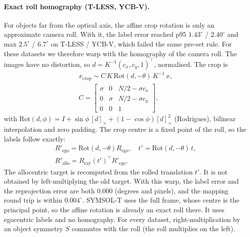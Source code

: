 \paragraph{Exact roll homography (T-LESS, YCB-V).}
For objects far from the optical axis, the affine crop rotation is only an approximate camera roll. With it, the label error reached p95 $1.43^\circ$ / $2.40^\circ$ and max $2.5^\circ$ / $6.7^\circ$ on T-LESS / YCB-V, which failed the same pre-set rule. For these datasets we therefore warp with the homography of the camera roll. The images have no distortion, so $d=K^{-1}(c_x,c_y,1)^\top$, normalised. The crop is
\begin{equation}
\begin{gathered}
  x_{\text{crop}}\sim C\,K\,\mathrm{Rot}(d,-\theta)\,K^{-1}\,x,\\
  C=\begin{bmatrix}\sigma&0&N/2-\sigma c_x\\0&\sigma&N/2-\sigma c_y\\0&0&1\end{bmatrix},
\end{gathered}
\end{equation}
with $\mathrm{Rot}(d,\phi)=I+\sin\phi\,[d]_\times+(1-\cos\phi)[d]_\times^2$ (Rodrigues), bilinear interpolation and zero padding. The crop centre is a fixed point of the roll, so the labels follow exactly:
\begin{equation}
\begin{gathered}
  R'_{\text{ego}}=\mathrm{Rot}(d,-\theta)R_{\text{ego}},\quad t'=\mathrm{Rot}(d,-\theta)\,t,\\
  R'_{\text{allo}}=R_{\text{ray}}(t')^\top R'_{\text{ego}}.
\end{gathered}
\end{equation}
The allocentric target is recomputed from the rolled translation $t'$. It is not obtained by left-multiplying the old target. With this warp, the label error and the reprojection error are both $0.000$ (degrees and pixels), and the mapping round trip is within $0.004^\circ$. SYMSOL-T uses the full frame, whose centre is the principal point, so the affine rotation is already an exact roll there. It uses egocentric labels and no homography. For every dataset, right-multiplication by an object symmetry $S$ commutes with the roll (the roll multiplies on the left).

